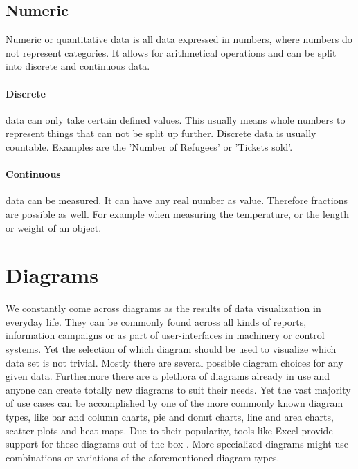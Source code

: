 \subsection{Numeric}

Numeric or quantitative data is all data expressed in numbers, where numbers do not represent categories. It allows for arithmetical operations and can be split into discrete and continuous data.

\paragraph{Discrete}
data can only take certain defined values. This usually means whole numbers to represent things that can not be split up further.  Discrete data is usually countable. Examples are the 'Number of Refugees' or 'Tickets sold'.

\paragraph{Continuous}
data can be measured. It can have any real number as value. Therefore fractions are possible as well. For example when measuring the temperature, or the length or weight of an object.


\section{Diagrams}

We constantly come across diagrams as the results of data visualization in everyday life. They can be commonly found across all kinds of reports, information campaigns or as part of user-interfaces in machinery or control systems. Yet the selection of which diagram should be used to visualize which data set is not trivial. Mostly there are several possible diagram choices for any given data. Furthermore there are a plethora of diagrams already in use and anyone can create totally new diagrams to suit their needs. Yet the vast majority of use cases can be accomplished by one of the more commonly known diagram types, like bar and column charts, pie and donut charts, line and area charts, scatter plots and heat maps. Due to their popularity, tools like Excel provide support for these diagrams out-of-the-box \cite{office_chart_types}. More specialized diagrams might use combinations or variations of the aforementioned diagram types. 

